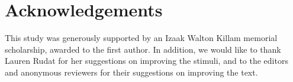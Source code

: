 \documentclass[output=paper,modfonts,nonflat]{langsci/langscibook}
\begin{document}









\section*{Acknowledgements}

This study was generously supported 
by an Izaak Walton Killam memorial scholarship, awarded to the first author. In addition, we would like to thank Lauren Rudat for her suggestions on improving the stimuli, and to the editors and anonymous reviewers for their suggestions on improving the text.
\end{document}
